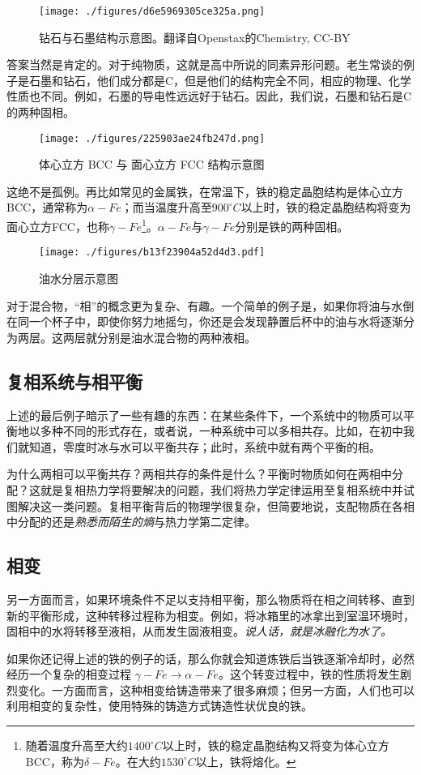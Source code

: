 \begin{figure}[ht]
\centering
\texttt{[image: ./figures/d6e5969305ce325a.png]}
\caption{钻石与石墨结构示意图。翻译自Openstax的Chemistry, CC-BY} \label{fig_PHS_3}
\end{figure}
答案当然是肯定的。对于纯物质，这就是高中所说的同素异形问题。老生常谈的例子是石墨和钻石，他们成分都是C，但是他们的结构完全不同，相应的物理、化学性质也不同。例如，石墨的导电性远远好于钻石。因此，我们说，石墨和钻石是C的两种固相。

\begin{figure}[ht]
\centering
\texttt{[image: ./figures/225903ae24fb247d.png]}
\caption{体心立方 BCC 与 面心立方 FCC 结构示意图} \label{fig_PHS_4}
\end{figure}
这绝不是孤例。再比如常见的金属铁，在常温下，铁的稳定晶胞结构是体心立方BCC，通常称为$\alpha-Fe$；而当温度升高至$900 ^\circ C$以上时，铁的稳定晶胞结构将变为面心立方FCC，也称$\gamma-Fe$\footnote{随着温度升高至大约$1400 ^\circ C$以上时，铁的稳定晶胞结构又将变为体心立方BCC，称为$\delta - Fe$。在大约$1530 ^\circ C$以上，铁将熔化。}。$\alpha-Fe$与$\gamma-Fe$分别是铁的两种固相。

\begin{figure}[ht]
\centering
\texttt{[image: ./figures/b13f23904a52d4d3.pdf]}
\caption{油水分层示意图} \label{fig_PHS_5}
\end{figure}
对于混合物，“相”的概念更为复杂、有趣。一个简单的例子是，如果你将油与水倒在同一个杯子中，即使你努力地摇匀，你还是会发现静置后杯中的油与水将逐渐分为两层。这两层就分别是油水混合物的两种液相。


\subsection{复相系统与相平衡}
上述的最后例子暗示了一些有趣的东西：在某些条件下，一个系统中的物质可以平衡地以多种不同的形式存在，或者说，一种系统中可以多相共存。比如，在初中我们就知道，零度时冰与水可以平衡共存；此时，系统中就有两个平衡的相。


为什么两相可以平衡共存？两相共存的条件是什么？平衡时物质如何在两相中分配？这就是复相热力学将要解决的问题，我们将热力学定律运用至复相系统中并试图解决这一类问题。复相平衡背后的物理学很复杂，但简要地说，支配物质在各相中分配的还是\textsl{熟悉而陌生的熵}与热力学第二定律。

\subsection{相变}
另一方面而言，如果环境条件不足以支持相平衡，那么物质将在相之间转移、直到新的平衡形成，这种转移过程称为相变。例如，将冰箱里的冰拿出到室温环境时，固相中的水将转移至液相，从而发生固液相变。\textsl{说人话，就是冰融化为水了。}

如果你还记得上述的铁的例子的话，那么你就会知道炼铁后当铁逐渐冷却时，必然经历一个复杂的相变过程 $\gamma - Fe \rightarrow \alpha - Fe$。这个转变过程中，铁的性质将发生剧烈变化。一方面而言，这种相变给铸造带来了很多麻烦；但另一方面，人们也可以利用相变的复杂性，使用特殊的铸造方式铸造性状优良的铁。
